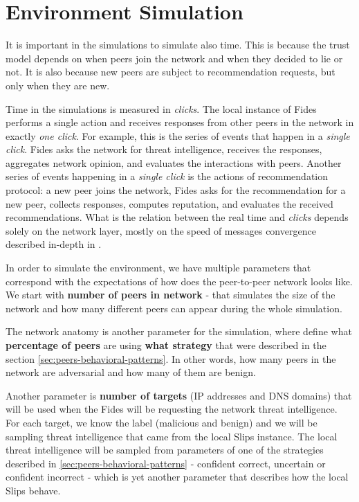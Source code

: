 \section{Environment Simulation}
\label{sec:environment-simulation}
It is important in the simulations to simulate also time. This is because the trust model depends on when peers join the network and when they decided to lie or not. It is also because new peers are subject to recommendation requests, but only when they are new.

Time in the simulations is measured in \textit{clicks}. 
The local instance of Fides performs a single action and receives responses from other peers in the network in exactly \textit{one click}. 
For example, this is the series of events that happen in a \textit{single click}. Fides asks the network for threat intelligence, receives the responses, aggregates network opinion, and evaluates the interactions with peers.
Another series of events happening in a \textit{single click} is the actions of  recommendation protocol: a new peer joins the network, Fides asks for the recommendation for  a new peer, collects responses, computes reputation, and evaluates the received recommendations.
What is the relation between the real time and \textit{clicks} depends solely on the network layer, mostly on the speed of messages convergence described in-depth in \cite{nl}.

In order to simulate the environment, we have multiple parameters that correspond with the expectations of how does the peer-to-peer network looks like.
We start with \textbf{number of peers in network} - that simulates the size of the network and how many different peers can appear during the whole simulation.

The network anatomy is another parameter for the simulation, where define what \textbf{percentage of peers} are using \textbf{what strategy} that were described in the section \ref{sec:peers-behavioral-patterns}. 
In other words, how many peers in the network are adversarial and how many of them are benign.

Another parameter is \textbf{number of targets} (IP addresses and DNS domains) that will be used when the Fides will be requesting the network threat intelligence.
For each target, we know the label (malicious and benign) and we will be sampling threat intelligence that came from the local Slips instance. 
The local threat intelligence will be sampled from parameters of one of the strategies described in \ref{sec:peers-behavioral-patterns} - confident correct, uncertain or confident incorrect - which is yet another parameter that describes how the local Slips behave.

